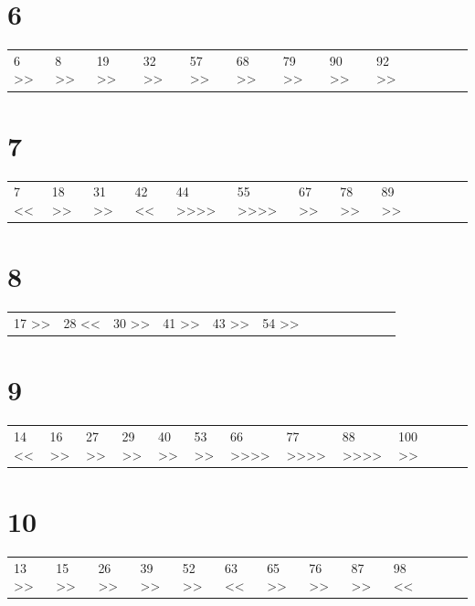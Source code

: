 \documentclass[11pt]{article}
\begin{document}
\section{6}
\label{sec-8}
\begin{center}
\begin{tabular}{lllllllllllll}
6 >> & 8 >> & 19 >> & 32 >> & 57 >> & 68 >> & 79 >> & 90 >> & 92 >> &  &  &  & \\
\end{tabular}
\end{center}
\section{7}
\label{sec-9}
\begin{center}
\begin{tabular}{lllllllllllll}
7 << & 18 >> & 31 >> & 42 << & 44 >>>> & 55 >>>> & 67 >> & 78 >> & 89 >> &  &  &  & \\
\end{tabular}
\end{center}
\section{8}
\label{sec-10}
\begin{center}
\begin{tabular}{lllllllllllll}
17 >> & 28 << & 30 >> & 41 >> & 43 >> & 54 >> &  &  &  &  &  &  & \\
\end{tabular}
\end{center}
\section{9}
\label{sec-11}
\begin{center}
\begin{tabular}{lllllllllllll}
14 << & 16 >> & 27 >> & 29 >> & 40 >> & 53 >> & 66 >>>> & 77 >>>> & 88 >>>> & 100 >> &  &  & \\
\end{tabular}
\end{center}
\section{10}
\label{sec-12}
\begin{center}
\begin{tabular}{lllllllllllll}
13 >> & 15 >> & 26 >> & 39 >> & 52 >> & 63 << & 65 >> & 76 >> & 87 >> & 98 << &  &  & \\
\end{tabular}
\end{center}
\end{document}
